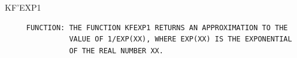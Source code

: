 \begin{frame}
KF'EXP1
\begin{verbatim}
     FUNCTION: THE FUNCTION KFEXP1 RETURNS AN APPROXIMATION TO THE
               VALUE OF 1/EXP(XX), WHERE EXP(XX) IS THE EXPONENTIAL
               OF THE REAL NUMBER XX.

\end{verbatim}
\end{frame}
